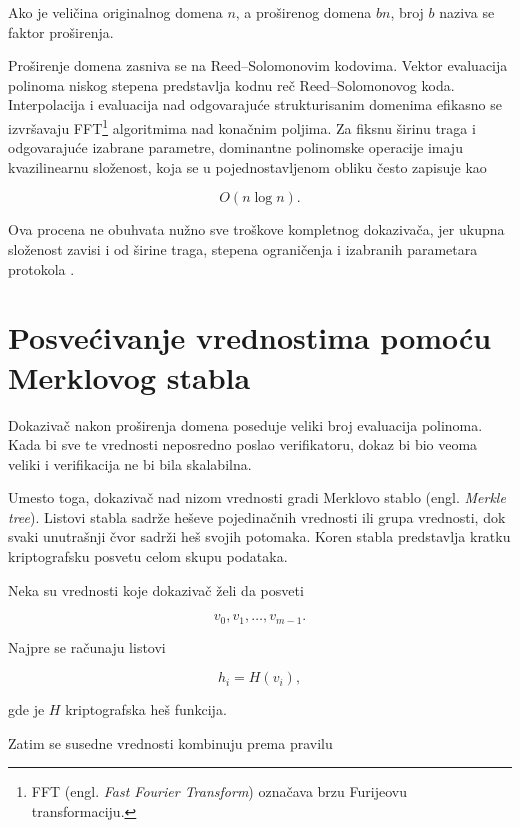 Ako je veličina originalnog domena \(n\), a proširenog domena \(bn\), broj
\(b\) naziva se faktor proširenja.

Proširenje domena zasniva se na Reed--Solomonovim kodovima. Vektor evaluacija
polinoma niskog stepena predstavlja kodnu reč Reed--Solomonovog koda.
Interpolacija i evaluacija nad odgovarajuće strukturisanim domenima efikasno se
izvršavaju FFT\footnote{FFT (engl. \textit{Fast Fourier Transform}) označava
brzu Furijeovu transformaciju.} algoritmima nad konačnim poljima. Za fiksnu širinu
traga i odgovarajuće izabrane parametre, dominantne polinomske operacije imaju
kvazilinearnu složenost, koja se u pojednostavljenom obliku često zapisuje kao

\begin{equation}
    O(n\log n).
\end{equation}

Ova procena ne obuhvata nužno sve troškove kompletnog dokazivača, jer ukupna
složenost zavisi i od širine traga, stepena ograničenja i izabranih parametara
protokola \cite{stark2018,ethstark2023}.

\section{Posvećivanje vrednostima pomoću Merklovog stabla}

Dokazivač nakon proširenja domena poseduje veliki broj evaluacija polinoma.
Kada bi sve te vrednosti neposredno poslao verifikatoru, dokaz bi bio veoma
veliki i verifikacija ne bi bila skalabilna.

Umesto toga, dokazivač nad nizom vrednosti gradi Merklovo stablo
(engl. \textit{Merkle tree}). Listovi stabla sadrže heševe pojedinačnih
vrednosti ili grupa vrednosti, dok svaki unutrašnji čvor sadrži heš svojih
potomaka. Koren stabla predstavlja kratku kriptografsku posvetu celom skupu
podataka.

Neka su vrednosti koje dokazivač želi da posveti

\begin{equation}
    v_0,v_1,\ldots,v_{m-1}.
\end{equation}

Najpre se računaju listovi

\begin{equation}
    h_i = H(v_i),
\end{equation}

gde je \(H\) kriptografska heš funkcija.

Zatim se susedne vrednosti kombinuju prema pravilu

